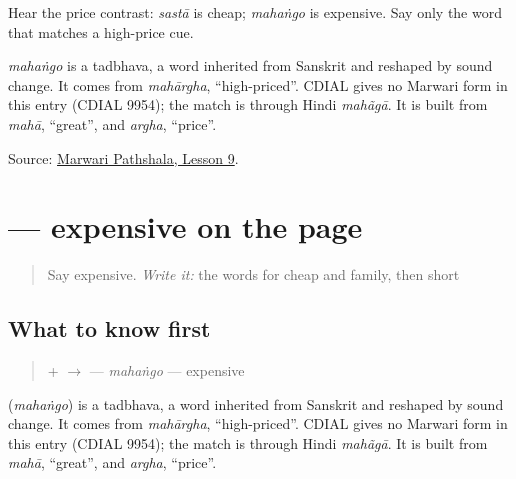 Hear the price contrast: \emph{sastā} is cheap; \emph{mahaṅgo} is expensive. Say only the word that matches a high-price cue.

\begin{cousinweb}
\emph{mahaṅgo} is a tadbhava, a word inherited from Sanskrit and reshaped by sound change. It comes from \emph{mahārgha}, \textquotedblleft{}high-priced\textquotedblright{}. CDIAL gives no Marwari form in this entry (CDIAL 9954); the match is through Hindi \emph{mahãgā}. It is built from \emph{mahā}, \textquotedblleft{}great\textquotedblright{}, and \emph{argha}, \textquotedblleft{}price\textquotedblright{}.
\end{cousinweb}

\begin{tcolorbox}[breakable,colback=teal!4,colframe=teal!35!black,title={Before you move on}]
Source: \href{https://www.marwaripathshala.com/marwari-lesson-9-english}{Marwari Pathshala, Lesson 9}.
\end{tcolorbox}
\section[\texorpdfstring{\mw{महंगो} (mahaṅgo)}{महंगो (mahaṅgo)}]{ — expensive on the page}

\label{lesson:MW-C15-mahango}



\begin{quote}
Say expensive. \emph{Write it:} the words for cheap and family, then short \textbf{}
\end{quote}

\subsection*{What to know first}
\begin{quote}
\textbf{} + \textbf{} $\to$ \textbf{} — \emph{mahaṅgo} — expensive
\end{quote}

\begin{cousinweb}
\textbf{} (\emph{mahaṅgo}) is a tadbhava, a word inherited from Sanskrit and reshaped by sound change. It comes from \emph{mahārgha}, \textquotedblleft{}high-priced\textquotedblright{}. CDIAL gives no Marwari form in this entry (CDIAL 9954); the match is through Hindi \emph{mahãgā}. It is built from \emph{mahā}, \textquotedblleft{}great\textquotedblright{}, and \emph{argha}, \textquotedblleft{}price\textquotedblright{}.
\end{cousinweb}

